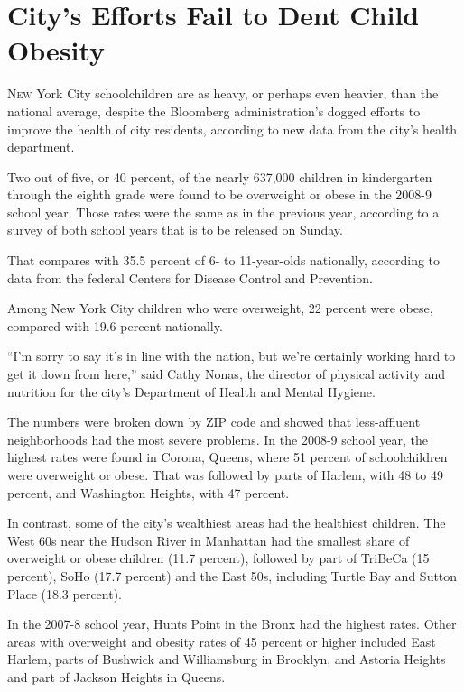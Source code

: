 ﻿\documentclass[12pt]{article}
\begin{document}
\pagebreak
\section{City's Efforts Fail to Dent Child Obesity}

\lettrine{N}{ew} York City schoolchildren are as heavy, or perhaps even
heavier, than the national average, despite the Bloomberg administration's dogged efforts to improve
the health of city residents, according to new data from the city's health department.

Two out of five, or 40 percent, of the nearly 637,000 children in kindergarten through the eighth
grade were found to be overweight or obese in the 2008-9 school year. Those rates were the same as
in the previous year, according to a survey of both school years that is to be released on Sunday.

That compares with 35.5 percent of 6- to 11-year-olds nationally, according to data from the federal
Centers for Disease Control and Prevention.

Among New York City children who were overweight, 22 percent were obese, compared with 19.6 percent
nationally.

``I'm sorry to say it's in line with the nation, but we're certainly working hard to get it down
from here,'' said Cathy Nonas, the director of physical activity and nutrition for the city's
Department of Health and Mental Hygiene.

The numbers were broken down by ZIP code and showed that less-affluent neighborhoods had the most
severe problems. In the 2008-9 school year, the highest rates were found in Corona, Queens, where 51
percent of schoolchildren were overweight or obese. That was followed by parts of Harlem, with 48 to
49 percent, and Washington Heights, with 47 percent.

In contrast, some of the city's wealthiest areas had the healthiest children. The West 60s near the
Hudson River in Manhattan had the smallest share of overweight or obese children (11.7 percent),
followed by part of TriBeCa (15 percent), SoHo (17.7 percent) and the East 50s, including Turtle Bay
and Sutton Place (18.3 percent).

In the 2007-8 school year, Hunts Point in the Bronx had the highest rates. Other areas with
overweight and obesity rates of 45 percent or higher included East Harlem, parts of Bushwick and
Williamsburg in Brooklyn, and Astoria Heights and part of Jackson Heights in Queens.
\end{document}
